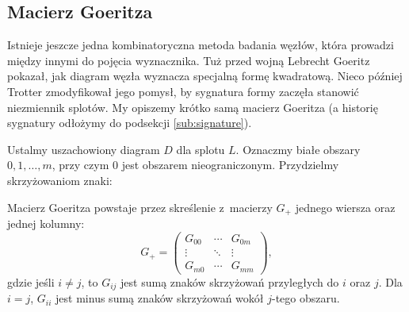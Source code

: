 
\subsection{Macierz Goeritza}
%
Istnieje jeszcze jedna kombinatoryczna metoda badania węzłów, która prowadzi między innymi do pojęcia wyznacznika.
Tuż przed wojną Lebrecht Goeritz pokazał, jak diagram węzła wyznacza specjalną formę kwadratową.
%
Nieco później Trotter zmodyfikował jego pomysł, by sygnatura formy zaczęła stanowić niezmiennik splotów.
%
%
%
%
My opiszemy krótko samą macierz Goeritza (a historię sygnatury odłożymy do podsekcji \ref{sub:signature}).

Ustalmy uszachowiony diagram $D$ dla splotu $L$.
%
Oznaczmy białe obszary $0, 1, \ldots, m$, przy czym $0$ jest obszarem nieograniczonym.
Przydzielmy skrzyżowaniom znaki:
\begin{comment}
\begin{figure}[H]
    \begin{minipage}[b]{.48\linewidth}
    \centering
    \LargePlusCrossingChessboard
    \end{minipage}
    \begin{minipage}[b]{.48\linewidth}
    \centering
    \LargeMinusCrossingChessboard
    \end{minipage}
\end{figure}
\end{comment}

\begin{definition}
    Macierz Goeritza powstaje przez skreślenie z~macierzy $G_+$ jednego wiersza oraz jednej kolumny:
    \begin{equation}
        G_+=\begin{pmatrix}
        G_{00} & \cdots & G_{0m} \\
        \vdots & \ddots & \vdots \\
        G_{m0} & \cdots & G_{mm}
        \end{pmatrix},
    \end{equation}
    gdzie jeśli $i\neq j$, to $G_{ij}$ jest sumą znaków skrzyżowań przyległych do $i$ oraz $j$.
    Dla $i = j$, $G_{ii}$ jest minus sumą znaków skrzyżowań wokół $j$-tego obszaru.
\end{definition}

